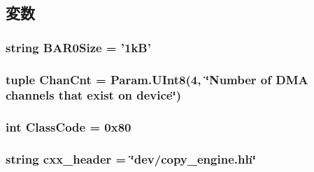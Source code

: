 \subsection{変数}
\hypertarget{classCopyEngine_1_1CopyEngine_aefc407ca01c833e5dac341709110c5e2}{
\subsubsection[{BAR0Size}]{\setlength{\rightskip}{0pt plus 5cm}string {\bf BAR0Size} = '1kB'}}
\label{classCopyEngine_1_1CopyEngine_aefc407ca01c833e5dac341709110c5e2}
\hypertarget{classCopyEngine_1_1CopyEngine_a62db8658b0c8694fae7c18a45a5b3879}{
\subsubsection[{ChanCnt}]{\setlength{\rightskip}{0pt plus 5cm}tuple {\bf ChanCnt} = Param.UInt8(4, \char`\"{}Number of DMA channels that exist on device\char`\"{})}}
\label{classCopyEngine_1_1CopyEngine_a62db8658b0c8694fae7c18a45a5b3879}
\hypertarget{classCopyEngine_1_1CopyEngine_a7d0125d1930fad943a6a7471da0317ad}{
\subsubsection[{ClassCode}]{\setlength{\rightskip}{0pt plus 5cm}int {\bf ClassCode} = 0x80}}
\label{classCopyEngine_1_1CopyEngine_a7d0125d1930fad943a6a7471da0317ad}
\hypertarget{classCopyEngine_1_1CopyEngine_a17da7064bc5c518791f0c891eff05fda}{
\subsubsection[{cxx\_\-header}]{\setlength{\rightskip}{0pt plus 5cm}string {\bf cxx\_\-header} = \char`\"{}dev/copy\_\-engine.hh\char`\"{}}}
